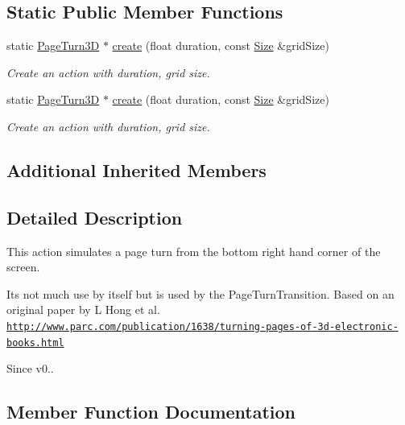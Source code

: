 \subsection*{Static Public Member Functions}
\begin{DoxyCompactItemize}
\item 
static \hyperlink{classPageTurn3D}{Page\+Turn3D} $\ast$ \hyperlink{classPageTurn3D_aa0e4fcc501ac1c486459a41539b3a604}{create} (float duration, const \hyperlink{classSize}{Size} \&grid\+Size)
\begin{DoxyCompactList}\small\item\em Create an action with duration, grid size. \end{DoxyCompactList}\item 
static \hyperlink{classPageTurn3D}{Page\+Turn3D} $\ast$ \hyperlink{classPageTurn3D_a627e22ddcf38209e8bc6f6b03146d423}{create} (float duration, const \hyperlink{classSize}{Size} \&grid\+Size)
\begin{DoxyCompactList}\small\item\em Create an action with duration, grid size. \end{DoxyCompactList}\end{DoxyCompactItemize}
\subsection*{Additional Inherited Members}


\subsection{Detailed Description}
This action simulates a page turn from the bottom right hand corner of the screen. 

It\textquotesingle{}s not much use by itself but is used by the Page\+Turn\+Transition. Based on an original paper by L Hong et al. \href{http://www.parc.com/publication/1638/turning-pages-of-3d-electronic-books.html}{\tt http\+://www.\+parc.\+com/publication/1638/turning-\/pages-\/of-\/3d-\/electronic-\/books.\+html}

\begin{DoxySince}{Since}
v0.. 
\end{DoxySince}


\subsection{Member Function Documentation}
\mbox{\label{classPageTurn3D_a98aa1300a97553c4f4185d974021bdc4}} 
